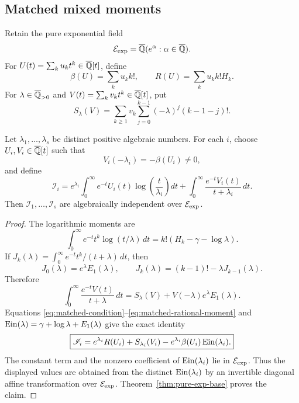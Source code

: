 \subsection{Matched mixed moments}

Retain the pure exponential field
\[
 \mathcal E_{\mathrm{exp}}=\overline{\mathbb Q}(e^\alpha:\alpha\in\overline{\mathbb Q}).
\]
For \(U(t)=\sum_ku_kt^k\in\overline{\mathbb Q}[t]\), define
\begin{equation}\label{eq:matched-beta-r}
 \beta(U)=\sum_ku_kk!,
 \qquad
 R(U)=\sum_ku_kk!H_k.
\end{equation}
For \(\lambda\in\overline{\mathbb Q}_{>0}\) and
\(V(t)=\sum_kv_kt^k\in\overline{\mathbb Q}[t]\), put
\begin{equation}\label{eq:matched-s}
 S_\lambda(V)=
 \sum_{k\geq1}v_k\sum_{j=0}^{k-1}
 (-\lambda)^j(k-1-j)!.
\end{equation}

\begin{theorem}
\label{thm:matched-mixed-integrals}
Let \(\lambda_1,\ldots,\lambda_s\) be distinct positive algebraic numbers.
For each \(i\), choose \(U_i,V_i\in\overline{\mathbb Q}[t]\) such that
\begin{equation}\label{eq:matched-condition}
 V_i(-\lambda_i)=-\beta(U_i)\ne0,
\end{equation}
and define
\begin{equation}\label{eq:matched-integral}
 \mathscr I_i=
 e^{\lambda_i}\int_0^\infty e^{-t}U_i(t)
       \log\!\left(\frac{t}{\lambda_i}\right)dt
 +\int_0^\infty\frac{e^{-t}V_i(t)}{t+\lambda_i}\,dt.
\end{equation}
Then \(\mathscr I_1,\ldots,\mathscr I_s\) are algebraically independent
over \(\mathcal E_{\mathrm{exp}}\).
\end{theorem}

\begin{proof}
The logarithmic moments are
\begin{equation}\label{eq:matched-log-moment}
 \int_0^\infty e^{-t}t^k\log(t/\lambda)\,dt
 =k!(H_k-\gamma-\log\lambda).
\end{equation}
If
\(J_k(\lambda)=\int_0^\infty e^{-t}t^k/(t+\lambda)\,dt\), then
\[
 J_0(\lambda)=e^\lambda E_1(\lambda),
 \qquad
 J_k(\lambda)=(k-1)!-\lambda J_{k-1}(\lambda).
\]
Therefore
\begin{equation}\label{eq:matched-rational-moment}
 \int_0^\infty\frac{e^{-t}V(t)}{t+\lambda}\,dt
 =S_\lambda(V)+V(-\lambda)e^\lambda E_1(\lambda).
\end{equation}
Equations \eqref{eq:matched-condition}--\eqref{eq:matched-rational-moment}
and
\(\operatorname{Ein}(\lambda)=\gamma+\log\lambda+E_1(\lambda)\) give the exact identity
\begin{equation}\label{eq:matched-affine-ein}
 \boxed{
 \mathscr I_i=e^{\lambda_i}R(U_i)+S_{\lambda_i}(V_i)
 -e^{\lambda_i}\beta(U_i)\operatorname{Ein}(\lambda_i).}
\end{equation}
The constant term and the nonzero coefficient of \(\operatorname{Ein}(\lambda_i)\) lie
in \(\mathcal E_{\mathrm{exp}}\).  Thus the displayed values are obtained from the distinct
\(\operatorname{Ein}(\lambda_i)\) by an invertible diagonal affine transformation over
\(\mathcal E_{\mathrm{exp}}\).  Theorem~\ref{thm:pure-exp-base} proves the claim.
\end{proof}

